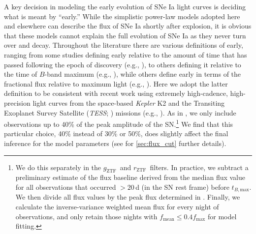 \documentclass[twocolumn]{./aastex63}
\newcommand{\rztf}{$r_\mathrm{ZTF}$}
\newcommand{\gztf}{$g_\mathrm{ZTF}$}
\newcommand{\tbmax}{$t_{B,\mathrm{max}}$}
\begin{document}
A key decision in modeling the early evolution of SNe Ia light curves is
deciding what is meant by ``early.'' While the simplistic power-law models
adopted here and elsewhere can describe the flux of SNe Ia shortly after
explosion, it is obvious that these models cannot explain the full evolution
of SNe Ia as they never turn over and decay. Throughout the literature there
are various definitions of early, ranging from some studies defining early
relative to the amount of time that has passed following the epoch of
discovery (e.g., \citealt{Nugent11,Zheng13,Miller18}), to others defining it
relative to the time of $B$-band maximum (e.g.,
\citealt{Riess99a,Aldering00,Conley06,Dimitriadis19}), while others define
early in terms of the fractional flux relative to maximum light (e.g.,
\citealt{Olling15,Firth15,Fausnaugh19}). Here we adopt the latter definition
to be consistent with recent work using extremely high-cadence, high-precision
light curves from the space-based \textit{Kepler} K2 \citep{Howell14} and the
Transiting Exoplanet Survey Satellite (\textit{TESS}; \citealt{Ricker15})
missions (e.g., \citealt{Olling15,Fausnaugh19}). As in \citet{Olling15}, we
only include observations up to 40\% of the peak amplitude of the
SN.\footnote{We do this separately in the \gztf\ and \rztf\ filters. In
practice, we subtract a preliminary estimate of the flux baseline derived from
the median flux value for all observations that occurred $>20$\,d (in the SN
rest frame) before \tbmax. We then divide all flux values by the peak flux
determined in \citet{Yao19}. Finally, we calculate the inverse-variance
weighted mean flux for every night of observations, and only retain those
nights with $f_\mathrm{mean} \le 0.4 f_\mathrm{max}$ for model fitting.} We
find that this particular choice, 40\% instead of 30\% or 50\%, does slightly
affect the final inference for the model parameters (see for
\ref{sec:flux_cut} further details).
\end{document}
